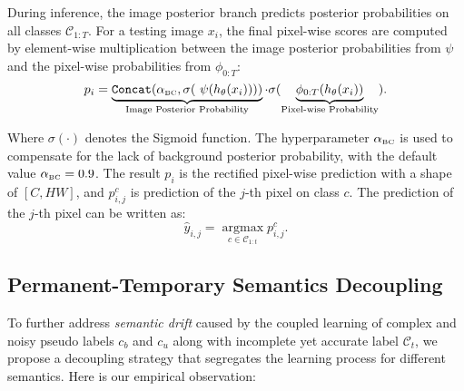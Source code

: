 During inference, the image posterior branch predicts posterior probabilities on all classes \(\mathcal{C}_{1:T}\). For a testing image \( x_i \), the final pixel-wise scores are computed by element-wise multiplication between the image posterior probabilities from \(\psi\) and the pixel-wise probabilities from \(\phi_{0:T}\): 
\begin{equation}
    p_{i} = 
    \underbrace{\texttt{Concat}(\alpha_{\text{\tiny BC}},\sigma(~\psi(h_\theta(x_i)))) }_{\text{Image Posterior Probability}}
    \cdot  
    \sigma (\underbrace{\phi_{0:T}(h_{\theta}(x_i))}_{\text{Pixel-wise Probability}}).
    \label{equ_3}
\end{equation}

Where \(\sigma(\cdot)\) denotes the Sigmoid function.
The hyperparameter \(\alpha_{\text{\tiny BC}}\) is used to compensate for the lack of background posterior probability, with the default value \(\alpha_{\text{\tiny BC}}=0.9\). 
The result \( p_i \) is the rectified pixel-wise prediction with a shape of \([C, HW]\), and \( p^c_{i,j} \) is prediction of the \( j \)-th pixel on class $c$. The prediction of the $j$-th pixel can be written as:
\begin{equation}
    \hat{y}_{i,j} = \mathop{\arg\max}\limits_{c\in\mathcal{C}_{1:t}} p_{i,j}^c.
    \label{equ_4}
\end{equation}

\subsection{Permanent-Temporary Semantics Decoupling}
\label{sec3-4}

To further address \textit{semantic drift} caused by the coupled learning of complex and noisy pseudo labels \( c_b \) and \( c_u \) along with incomplete yet accurate label \(\mathcal{C}_t\), we propose a decoupling strategy that segregates the learning process for different semantics. Here is our empirical observation:

